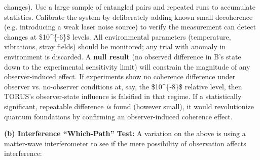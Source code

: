 \begin{enumerate}
  changes)​. Use a large sample of entangled pairs and repeated runs to
  accumulate statistics. Calibrate the system by deliberately adding
  known small decoherence (e.g. introducing a weak laser noise source)
  to verify the measurement can detect changes at \$10\^{}\{-6\}\$
  levels. All environmental parameters (temperature, vibrations, stray
  fields) should be monitored; any trial with anomaly in environment is
  discarded. A \textbf{null result} (no observed difference in B's state
  down to the experimental sensitivity limit) will constrain the
  magnitude of any observer-induced effect. If experiments show no
  coherence difference under observer vs. no-observer conditions at,
  say, the \$10\^{}\{-8\}\$ relative level, then TORUS's observer-state
  influence is falsified in that regime​. If a statistically
  significant, repeatable difference \emph{is} found (however small), it
  would revolutionize quantum foundations by confirming an
  observer-induced coherence effect​.
\end{enumerate}

\textbf{(b) Interference ``Which-Path'' Test:} A variation on the above
is using a matter-wave interferometer to see if the mere possibility of
observation affects interference:

